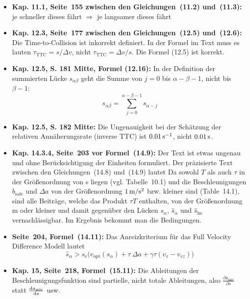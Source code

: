 \documentclass[11pt,a4paper]{scrartcl}
\providecommand{\gquote}[1]{\glqq #1\grqq}  %
\providecommand{\abl}[2]   {\frac{\D #1}{\D #2}}  %
\providecommand{\ablpart}[2]{\frac{\partial #1}{\partial #2}}  %
\providecommand{\hats}{\hat{s}}
\renewcommand{\abl}[2]{\frac{{\rm d} #1}{{\rm d} #2}}  %
\providecommand{\bdm}{\begin{displaymath}}
\providecommand{\edm}{\end{displaymath}}
\providecommand{\3}{{\ss}}
\providecommand{\gquote}[1]{\glqq #1\grqq}  %
\begin{document}
\begin{itemize}
\item
\textbf{Kap. 11.1, Seite~155 zwischen den Gleichungen~(11.2) und~(11.3):}
\gquote{je schneller dieses f\"ahrt} $\Rightarrow$ \gquote{je langsamer dieses
f\"ahrt}

\item
\textbf{Kap. 12.3, Seite~177 zwischen den Gleichungen~(12.5) und~(12.6):}
Die Time-to-Collision ist inkorrekt definiert. In der Formel im Text
muss es lauten $\tau_\text{TTC}=s/\Delta v$, nicht $\tau_\text{TTC}=\Delta
v/s$. Die Formel (12.5) ist korrekt.

\item
\textbf{Kap. 12.5, S. 181 Mitte, Formel (12.16):}
In der Definition der summierten L\"ucke $s_{\alpha\beta}$ geht die
Summe von $j=0$ bis $\alpha-\beta-1$, nicht bis $\beta-1$:
\bdm
s_{\alpha\beta}=\sum\limits_{j=0}^{\alpha-\beta-1}s_{\alpha-j}
\edm

\item
\textbf{Kap. 12.5, S. 182 Mitte:}
Die Ungenauigkeit bei der Sch\"atzung der relativen Ann\"aherungsrate
(inverse TTC) ist  $\unit[0.01]{s^{-1}}$, nicht  $\unit[0.01]{s}$.

\item
\textbf{Kap. 14.3.4, Seite~203 vor Formel~(14.9):}
Der Text ist etwas ungenau und ohne Ber\"ucksichtigung der Einheiten
formuliert. Der pr\"azisierte Text zwischen den Gleichungen~(14.8) 
und~(14.9) lautet
\gquote{Da sowohl $T$ als auch $\tau$ in der Gr\"o\3enordnung von \unit[1]{s} liegen
(vgl. Tabelle~10.1)
und die Beschleunigungen $b_\text{safe}$
und $\Delta a$ von der Gr\"o\3enordnung $\unit[1]{m/s^2}$ bzw. kleiner
sind (Table~14.1),
sind alle Beitr\"age, welche das Produkt
$\tau T$ enthalten, von
der Gr\"o\3enordnung \unit[1]{m} oder kleiner und
damit gegen\"uber den L\"ucken $s_{\alpha}$, $\hat{s}_{\alpha}$ und
$\hat{s}_\text{hz}$ vernachl\"assigbar. Im Ergebnis bekommt man die Bedingungen.}

\item
\textbf{Seite~204, Formel~(14.11):}
Das Anreizkriterium f\"ur das Full Velocity Difference Modell lautet
\bdm
\hats_{\alpha} > s_\text{e} \big(v_\text{opt}(s_{\alpha})+\tau \ \Delta a
 + \gamma\tau(v_v-v_{vz}) \big)
\edm

\item
\textbf{Kap. 15, Seite~218, Formel~(15.11):}
Die Ableitungen der Beschleunigungsfunktion sind partielle, nicht
totale Ableitungen, also $\ablpart{a_\text{mic}}{s}$ statt
$\abl{a_\text{mic}}{s}$ usw.


\end{itemize}
\end{document}
